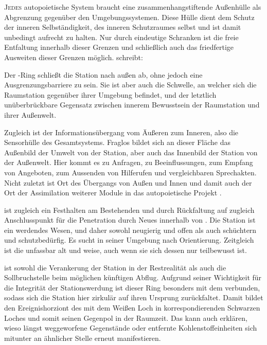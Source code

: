     \begin{newstuff}
        \lettrine{J}{edes} autopoietische System braucht eine zusammenhangstiftende Außenhülle als  Abgrenzung gegenüber den Umgebungssystemen. Diese Hülle dient dem Schutz der inneren Selbständigkeit, des inneren Schutzraumes selbst und ist damit unbedingt aufrecht zu halten. Nur durch eindeutige Schranken ist die freie Entfaltung innerhalb dieser Grenzen und schließlich auch das friedfertige Ausweiten dieser Grenzen möglich. \cite[S. 189]{cbasebook} schreibt:


        Der -Ring schließt die Station nach außen ab, ohne jedoch eine Ausgrenzungsbarriere zu sein. Sie ist aber auch die Schwelle, an welcher sich die Raumstation gegenüber ihrer Umgebung befindet, und der letztlich unüberbrückbare Gegensatz zwischen innerem Bewusstsein der Raumstation und ihrer Außenwelt. 
        
        Zugleich ist  der Informationsübergang vom Äußeren zum Inneren, also die Sensorhülle des Gesamtsystems. Fraglos bildet sich an dieser Fläche das Außenbild der Umwelt von der Station, aber auch das Innenbild der Station von der Außenwelt. Hier kommt es zu Anfragen, zu Beeinflussungen, zum Empfang von Angeboten, zum Aussenden von Hilferufen und vergleichbaren Sprechakten. Nicht zuletzt ist  Ort des Übergangs von Außen und Innen und damit auch der Ort der Assimilation weiterer Module in das autopoietische Projekt .
        
         ist zugleich ein Festhalten am Bestehenden und durch Rückfaltung auf  zugleich Anschlusspunkt für die Penetration durch Neues innerhalb von . Die Station ist ein werdendes Wesen, und daher sowohl neugierig und offen als auch schüchtern und schutzbedürfig. Es sucht in seiner Umgebung nach Orientierung. Zeitgleich ist die  unfassbar alt und weise, auch wenn sie sich dessen nur teilbewusst ist.
        
         ist sowohl die Verankerung der Station in der Restrealität als auch die Sollbruchstelle beim möglichen künftigen Abflug. Aufgrund seiner Wichtigkeit für die Integrität der Stationswerdung ist dieser Ring besonders mit dem  verbunden, sodass sich die Station hier zirkulär auf ihren Ursprung zurückfaltet. Damit bildet  den Ereignishorziont des mit dem Weißen Loch in  korrespondierenden Schwarzen Loches und somit seinen Gegenpol in der Raumzeit. Das kann auch erklären, wieso längst weggeworfene Gegenstände oder entfernte Kohlenstoffeinheiten sich mitunter an ähnlicher Stelle erneut manifestieren.
        

\end{newstuff}
